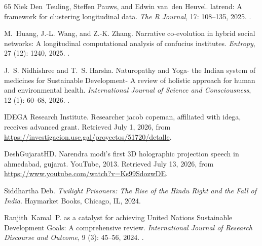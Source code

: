 \documentclass[11pt]{article}
\begin{document}
\begin{thebibliography}{65}
Niek Den~Teuling, Steffen Pauws, and Edwin van~den Heuvel.
\newblock latrend: A framework for clustering longitudinal data.
\newblock \emph{The R Journal}, 17: 108--135, 2025.
\newblock {}.

M.~Huang, J.-L. Wang, and Z.-K. Zhang.
\newblock Narrative co-evolution in hybrid social networks: A longitudinal
  computational analysis of confucius institutes.
\newblock \emph{Entropy}, 27 (12): 1240, 2025.
\newblock {}.

J.~S. Nidhishree and T.~S. Harsha.
\newblock Naturopathy and {Yoga}- the {Indian} system of medicines for
  {Sustainable Development}- {A} review of holistic approach for human and
  environmental health.
\newblock \emph{International Journal of Science and Consciousness},
  12 (1): 60--68, 2026.
\newblock {}.

{IDEGA Research Institute}.
\newblock Researcher jacob copeman, affiliated with idega, receives advanced
  grant.
\newblock Retrieved July 1, 2026, from
  \url{https://investigacion.usc.gal/proyectos/51720/detalle}.

{DeshGujaratHD}.
\newblock Narendra modi's first {3D} holographic projection speech in
  ahmedabad, gujarat.
\newblock YouTube, 2013.
\newblock Retrieved July 13, 2026, from
  \url{https://www.youtube.com/watch?v=Ks99SdozwDE}.

Siddhartha Deb.
\newblock \emph{Twilight Prisoners: The Rise of the Hindu Right and the Fall of
  India}.
\newblock Haymarket Books, Chicago, IL, 2024.

Ranjith~Kamal~P.
 as a catalyst for achieving {United Nations Sustainable Development Goals}: {A} comprehensive review.
\newblock \emph{International Journal of Research Discourse and Outcome}, 9 (3): 45--56, 2024.
\newblock {}.

\end{thebibliography}
\end{document}
